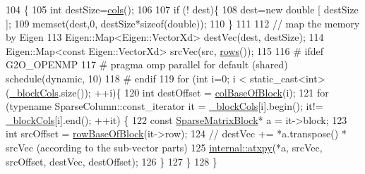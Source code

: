 \begin{DoxyCode}
104       \{
105         \textcolor{keywordtype}{int} destSize=\hyperlink{classg2o_1_1SparseBlockMatrixCCS_a4f04707008af38a3c368eed74ad0bffc}{cols}();
106 
107         \textcolor{keywordflow}{if} (! dest)\{
108           dest=\textcolor{keyword}{new} \textcolor{keywordtype}{double} [ destSize ];
109           memset(dest,0, destSize*\textcolor{keyword}{sizeof}(\textcolor{keywordtype}{double}));
110         \}
111 
112         \textcolor{comment}{// map the memory by Eigen}
113         Eigen::Map<Eigen::VectorXd> destVec(dest, destSize);
114         Eigen::Map<const Eigen::VectorXd> srcVec(src, \hyperlink{classg2o_1_1SparseBlockMatrixCCS_ac40b53774ff036f56faaa0bfb87837c0}{rows}());
115 
116 \textcolor{preprocessor}{#      ifdef G2O\_OPENMP}
117 \textcolor{preprocessor}{#      pragma omp parallel for default (shared) schedule(dynamic, 10)}
118 \textcolor{preprocessor}{#      endif}
119         \textcolor{keywordflow}{for} (\textcolor{keywordtype}{int} i=0; i < static\_cast<int>(\hyperlink{classg2o_1_1SparseBlockMatrixCCS_ab6b173607380a367cc1cd67442c1c3e2}{\_blockCols}.size()); ++i)\{
120           \textcolor{keywordtype}{int} destOffset = \hyperlink{classg2o_1_1SparseBlockMatrixCCS_a3a2820367f643881ebd0a45f2cd0c9be}{colBaseOfBlock}(i);
121           \textcolor{keywordflow}{for} (\textcolor{keyword}{typename} SparseColumn::const\_iterator it = \hyperlink{classg2o_1_1SparseBlockMatrixCCS_ab6b173607380a367cc1cd67442c1c3e2}{\_blockCols}[i].begin(); it!=
      \hyperlink{classg2o_1_1SparseBlockMatrixCCS_ab6b173607380a367cc1cd67442c1c3e2}{\_blockCols}[i].end(); ++it) \{
122             \textcolor{keyword}{const} \hyperlink{classg2o_1_1SparseBlockMatrixCCS_a41ea1c8c9d94a25544903ae8345c0354}{SparseMatrixBlock}* a = it->block;
123             \textcolor{keywordtype}{int} srcOffset = \hyperlink{classg2o_1_1SparseBlockMatrixCCS_a8b35a98d3343554699811f682042a647}{rowBaseOfBlock}(it->row);
124             \textcolor{comment}{// destVec += *a.transpose() * srcVec (according to the sub-vector parts)}
125             \hyperlink{namespaceg2o_1_1internal_ad176878dff85b91f1dbabed52cbf696e}{internal::atxpy}(*a, srcVec, srcOffset, destVec, destOffset);
126           \}
127         \}
128       \}
\end{DoxyCode}
